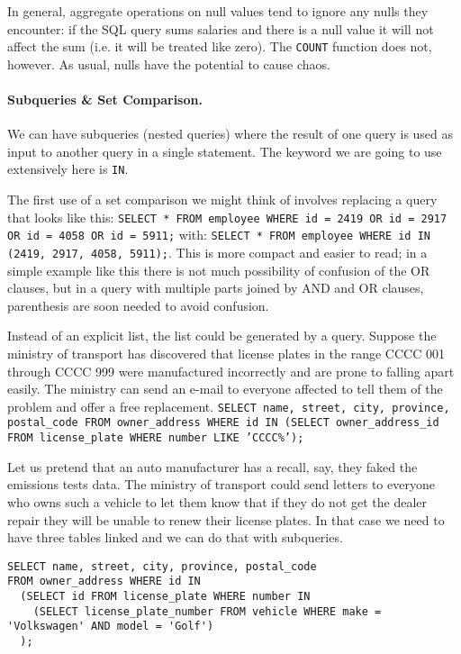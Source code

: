 \documentclass[a4paper]{report}
\begin{document}
In general, aggregate operations on null values tend to ignore any nulls they encounter: if the SQL query sums salaries and there is a null value it will not affect the sum (i.e. it will be treated like zero). The \texttt{COUNT} function does not, however. As usual, nulls have the potential to cause chaos.
	
\paragraph{Subqueries \& Set Comparison.}
We can have subqueries (nested queries) where the result of one query is used as input to another query in a single statement. The keyword we are going to use extensively here is \texttt{IN}.  

The first use of a set comparison we might think of involves replacing a query that looks like this: \texttt{SELECT * FROM employee WHERE id = 2419 OR id = 2917 OR id = 4058 OR id = 5911;} with: \texttt{SELECT * FROM employee WHERE id IN (2419, 2917, 4058, 5911);}. This is more compact and easier to read; in a simple example like this there is not much possibility of confusion of the OR clauses, but in a query with multiple parts joined by AND and OR clauses, parenthesis are soon needed to avoid confusion. 

Instead of an explicit list, the list could be generated by a query. Suppose the ministry of transport has discovered that license plates in the range CCCC 001 through CCCC 999 were manufactured incorrectly and are prone to falling apart easily. The ministry can send an e-mail to everyone affected to tell them of the problem and offer a free replacement. \texttt{SELECT name, street, city, province, postal\_code FROM owner\_address WHERE id IN (SELECT owner\_address\_id FROM license\_plate WHERE number LIKE 'CCCC\%');}


Let us pretend that an auto manufacturer has a recall, say, they faked the emissions tests data. The ministry of transport could send letters to everyone who owns such a vehicle to let them know that if they do not get the dealer repair they will be unable to renew their license plates. In that case we need to have three tables linked and we can do that with subqueries.

\begin{verbatim}
SELECT name, street, city, province, postal_code 
FROM owner_address WHERE id IN 
  (SELECT id FROM license_plate WHERE number IN 
    (SELECT license_plate_number FROM vehicle WHERE make = 'Volkswagen' AND model = 'Golf')
  );
\end{verbatim}
\end{document}
